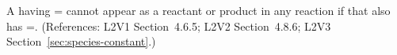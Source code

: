 A \Species having = cannot
appear as a reactant or product in any reaction if that \Species
also has =.  (References: L2V1
Section~4.6.5; L2V2 Section~4.8.6; L2V3 Section~\ref{sec:species-constant}.)
